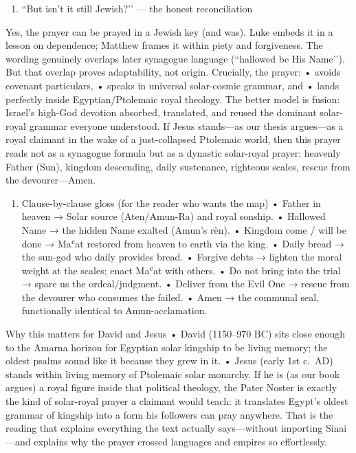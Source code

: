 \begin{enumerate}
    \def\labelenumi{\arabic{enumi})}
    \setcounter{enumi}{4}
    \item
    ``But isn’t it still Jewish?’’ — the honest reconciliation
\end{enumerate}
Yes, the prayer can be prayed in a Jewish key (and was).
Luke embeds it in a lesson on dependence; Matthew frames it within piety and forgiveness.
The wording genuinely overlaps later synagogue language (``hallowed be His Name’’).
But that overlap proves adaptability, not origin.
Crucially, the prayer: • avoids covenant particulars, • speaks in universal solar-cosmic grammar, and • lands perfectly inside Egyptian/Ptolemaic royal theology.
The better model is fusion: Israel’s high-God devotion absorbed, translated, and reused the dominant solar-royal grammar everyone understood.
If Jesus stands—as our thesis argues—as a royal claimant in the wake of a just-collapsed Ptolemaic world, then this prayer reads not as a synagogue formula but as a dynastic solar-royal prayer: heavenly Father (Sun), kingdom descending, daily sustenance, righteous scales, rescue from the devourer—Amen.

\begin{enumerate}
    \def\labelenumi{\arabic{enumi})}
    \setcounter{enumi}{5}
    \item
    Clause-by-clause gloss (for the reader who wants the map) • Father in heaven → Solar source (Aten/Amun-Ra) and royal sonship.
    • Hallowed Name → the hidden Name exalted (Amun’s rèn).
    • Kingdom come / will be done → Maʿat restored from heaven to earth via the king.
    • Daily bread → the sun-god who daily provides bread.
    • Forgive debts → lighten the moral weight at the scales; enact Maʿat with others.
    • Do not bring into the trial → spare us the ordeal/judgment.
    • Deliver from the Evil One → rescue from the devourer who consumes the failed.
    • Amen → the communal seal, functionally identical to Amun-acclamation.
\end{enumerate}
Why this matters for David and Jesus • David (1150–970 BC) sits close enough to the Amarna horizon for Egyptian solar kingship to be living memory; the oldest psalms sound like it because they grew in it.
• Jesus (early 1st c.~AD) stands within living memory of Ptolemaic solar monarchy.
If he is (as our book argues) a royal figure inside that political theology, the Pater Noster is exactly the kind of solar-royal prayer a claimant would teach: it translates Egypt’s oldest grammar of kingship into a form his followers can pray anywhere.
That is the reading that explains everything the text actually says—without importing Sinai—and explains why the prayer crossed languages and empires so effortlessly.

